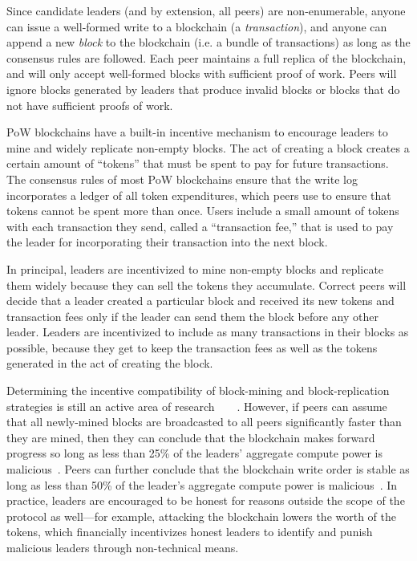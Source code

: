 Since candidate leaders (and by extension, all peers) are non-enumerable,
anyone can issue a well-formed write to a blockchain
(a \emph{transaction}), and anyone can append a new \emph{block} to the
blockchain (i.e. a bundle of transactions)
as long as the consensus rules are followed.  Each peer maintains a full replica
of the blockchain, and will only accept well-formed blocks with sufficient proof
of work.  Peers will ignore blocks generated by leaders that produce invalid
blocks or blocks that do not have sufficient proofs of work.

PoW blockchains have a built-in incentive mechanism to encourage leaders to mine
and widely replicate non-empty blocks.  The act of creating a block creates a
certain amount of ``tokens'' that must be spent to pay for future transactions.
The consensus rules of most PoW blockchains ensure that the write log
incorporates a ledger of all token expenditures, which peers use to ensure that
tokens cannot be spent more than once.  Users include a small amount of tokens
with each transaction they send, called a ``transaction fee,'' that is used to
pay the leader for incorporating their transaction into the next block.

In principal, leaders are incentivized to mine non-empty blocks and replicate them widely
because they can sell the tokens they accumulate.  Correct peers will 
decide that a leader created a particular block and received its new tokens and
transaction fees only if the leader can send them the block before any other leader.
Leaders are incentivized to include as many transactions in their blocks as
possible, because they get to keep the transaction fees as well as the tokens
generated in the act of creating the block.

Determining the incentive compatibility of block-mining and block-replication
strategies is still an active area of
research~\cite{ghost-mining}~\cite{stubborn-mining}~\cite{on-blockchain-decentralization}~\cite{bitcoin-incentive-compatibility}.
However, if peers can assume that all newly-mined blocks are broadcasted to all peers
significantly faster than they are mined, then they can conclude that the
blockchain makes forward progress so long as less than 25\% of the leaders'
aggregate compute power is malicious~\cite{selfish-mining}.  Peers can further
conclude that the blockchain write order is stable as long as less than 50\% of
the leader's aggregate compute power is malicious~\cite{bitcoin}.  In practice,
leaders are encouraged to be honest for reasons outside the scope of the
protocol as well---for example, attacking the blockchain lowers the worth of the
tokens, which financially incentivizes honest leaders to identify and punish
malicious leaders through non-technical means.

